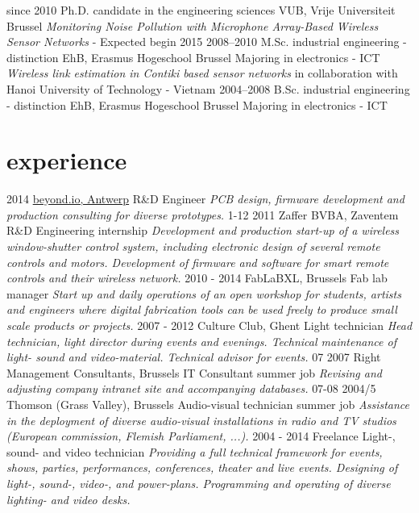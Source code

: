 \documentclass[]{friggeri-cv}
\begin{document}
\begin{entrylist}
  \entry
    {since 2010}
    {Ph.D. {\normalfont candidate in the engineering sciences}}
    {VUB, Vrije Universiteit Brussel}
    {\emph{Monitoring Noise Pollution with Microphone Array-Based Wireless Sensor Networks} - Expected begin 2015}
  \entry
    {2008–2010}
    {M.Sc. {\normalfont industrial engineering - distinction}}
    {EhB, Erasmus Hogeschool Brussel}
    {Majoring in electronics - ICT\\
    \emph{Wireless link estimation in Contiki based sensor networks} in collaboration with Hanoi University of Technology - Vietnam}
  \entry
    {2004–2008}
    {B.Sc. {\normalfont industrial engineering - distinction}}
    {EhB, Erasmus Hogeschool Brussel}
    {Majoring in electronics - ICT}
\end{entrylist}

\section{experience}

\begin{entrylist}
  \entry
    {2014}
    {\href{http://beyond.io}{beyond.io, Antwerp}}
    {R\&D Engineer}
    {\emph{PCB design, firmware development and production consulting for diverse prototypes.}}
  \entry
    {1-12 2011}
    {Zaffer BVBA, Zaventem}
    {R\&D Engineering internship}
    {\emph{Development and production start-up of a wireless window-shutter control system, including electronic design of several remote controls and motors. Development of firmware and software for smart remote controls and their wireless network.}}
  \entry
    {2010 - 2014}
    {FabLaBXL, Brussels}
    {Fab lab manager}
    {\emph{Start up and daily operations of an open workshop for students, artists and engineers where digital fabrication tools can be used freely to produce small scale products or projects.}}
  \entry
    {2007 - 2012}
    {Culture Club, Ghent}
    {Light technician}
    {\emph{Head technician, light director during events and evenings. Technical maintenance of light- sound and video-material. Technical advisor for events.}}
  \entry
    {07 2007}
    {Right Management Consultants, Brussels}
    {IT Consultant summer job}
    {\emph{Revising and adjusting company intranet site and accompanying databases.}}
  \entry
    {07-08 2004/5}
    {Thomson (Grass Valley), Brussels}
    {Audio-visual technician summer job}
    {\emph{Assistance in the deployment of diverse audio-visual installations in radio and TV studios (European commission, Flemish Parliament, ...).}}
  \entry
    {2004 - 2014}
    {Freelance}
    {Light-, sound- and video technician}
    {\emph{Providing a full technical framework for events, shows, parties, performances, conferences, theater and live events. Designing of light-, sound-, video-, and power-plans. Programming and operating of diverse lighting- and video desks. 
    }}
\end{entrylist}
\end{document}
